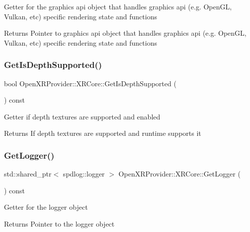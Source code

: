 Getter for the graphics api object that handles graphics api (e.\+g. Open\+GL, Vulkan, etc) specific rendering state and functions \begin{DoxyReturn}{Returns}
Pointer to graphics api object that handles graphics api (e.\+g. Open\+GL, Vulkan, etc) specific rendering state and functions 
\end{DoxyReturn}
\mbox{\label{class_open_x_r_provider_1_1_x_r_core_ab7899cb6ffb6237f7add041023ca5fc6}} 
\subsubsection{\texorpdfstring{GetIsDepthSupported()}{GetIsDepthSupported()}}
{\footnotesize\ttfamily bool Open\+X\+R\+Provider\+::\+X\+R\+Core\+::\+Get\+Is\+Depth\+Supported (\begin{DoxyParamCaption}{ }\end{DoxyParamCaption}) const\hspace{0.3cm}{\ttfamily [inline]}}

Getter if depth textures are supported and enabled \begin{DoxyReturn}{Returns}
If depth textures are supported and runtime supports it 
\end{DoxyReturn}
\mbox{\label{class_open_x_r_provider_1_1_x_r_core_a7e1827a985837520af9f406633abbe69}} 
\subsubsection{\texorpdfstring{GetLogger()}{GetLogger()}}
{\footnotesize\ttfamily std\+::shared\+\_\+ptr$<$ spdlog\+::logger $>$ Open\+X\+R\+Provider\+::\+X\+R\+Core\+::\+Get\+Logger (\begin{DoxyParamCaption}{ }\end{DoxyParamCaption}) const\hspace{0.3cm}{\ttfamily [inline]}}

Getter for the logger object \begin{DoxyReturn}{Returns}
Pointer to the logger object 
\end{DoxyReturn}
\mbox{\label{class_open_x_r_provider_1_1_x_r_core_a19d3b284191aaa25e10093e365376e5d}} 
